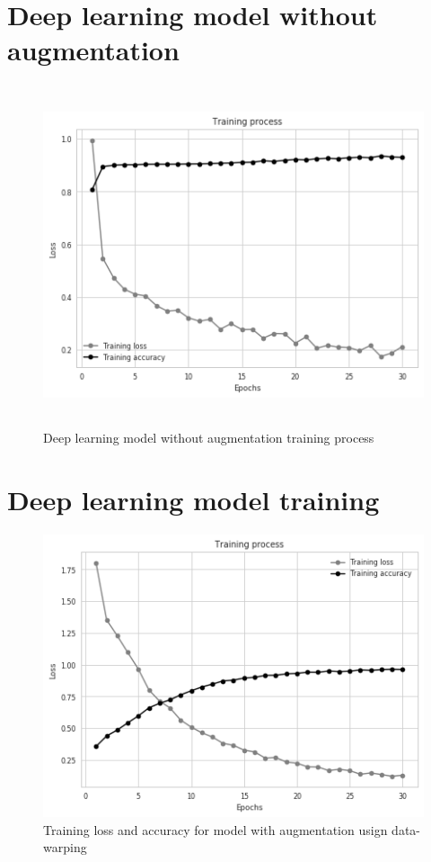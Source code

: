 \chapter{Deep learning model without augmentation}
\begin{figure}[ht]
	\begin{center}
		\includegraphics[width=12cm,height=10cm,keepaspectratio]{images/model1_training.png}
		\caption{Deep learning model without augmentation training process}
		\label{fig:first model training}
	\end{center}
\end{figure}

\chapter{Deep learning model training}
\begin{figure}[ht]
	\begin{center}
		\includegraphics[width=\textwidth]{images/model_2.png}
		\caption{Training loss and accuracy for model with augmentation usign data-warping}
		\label{fig:second model}
	\end{center}
\end{figure}

